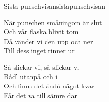 \begin{song}{Sista punschvisan}{sistapunschvisan}
\begin{vers}
När punschen småningom är slut\\
Och vår flaska blivit tom\\
Då vänder vi den upp och ner\\
Till dess inget rinner ur\\
\end{vers}
\begin{vers}
\repopen Så slickar vi, så slickar vi\\
Båd' utanpå och i\\
Och finns det ändå något kvar\\
Får det va till sämre dar \repclose\\
\end{vers}
\end{song}
